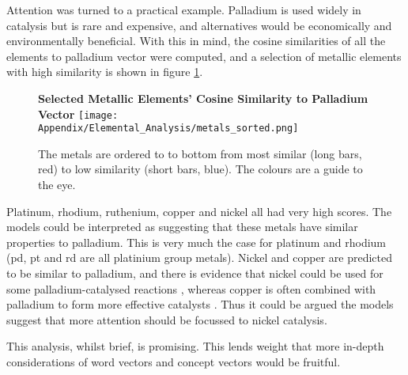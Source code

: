 Attention was turned to a practical example. Palladium is used widely in catalysis but is rare and expensive, and alternatives would be economically and environmentally beneficial\cite{palladium}. With this in mind, the cosine similarities of all the elements to palladium vector were computed, and a selection of metallic elements with high similarity is shown in figure \ref{fig:palladium}. 
\begin{center}
\begin{figure}[H]
  \centering
  \textbf{Selected Metallic Elements' Cosine Similarity to Palladium Vector}
    \texttt{[image: Appendix/Elemental\_Analysis/metals\_sorted.png]}
    \caption[Selected metallic elements' cosine similarity to palladium vector]{The metals are ordered to to bottom from most similar (long bars, red) to low similarity (short bars, blue). The colours are a guide to the eye.}
    \label{fig:palladium}
\end{figure} 
\end{center}
\vspace{-1cm}
Platinum, rhodium, ruthenium, copper and nickel all had very high scores. The models could be interpreted as suggesting that these metals have similar properties to palladium. This is very much the case for platinum and rhodium (pd, pt and rd are all platinium group metals)\cite{pgm}. Nickel and copper are predicted to be similar to palladium, and there is evidence that nickel could be used for some palladium-catalysed reactions \cite{nickel}, whereas copper is often combined with palladium to form more effective catalysts \cite{copper}. Thus it could be argued the models suggest that more attention should be focussed to nickel catalysis.

This analysis, whilst brief, is promising. This lends weight that more in-depth considerations of word vectors and concept vectors would be fruitful.